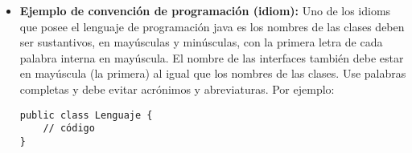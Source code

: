 \documentclass[11pt,letterpaper]{article}
\begin{document}
\begin{enumerate}
\begin{itemize}
\begin{itemize}
                  \item \textbf{Ejemplo de convención de programación (idiom):}
                        Uno de los idioms que posee el lenguaje de programación
                        java es los nombres de las clases deben ser sustantivos,
                        en mayúsculas y minúsculas, con la primera letra de cada
                        palabra interna en mayúscula. El nombre de las
                        interfaces también debe estar en mayúscula (la primera)
                        al igual que los nombres de las clases. Use palabras
                        completas y debe evitar acrónimos y abreviaturas. Por
                        ejemplo:
\begin{verbatim}
public class Lenguaje {
    // código
}
\end{verbatim}


\end{itemize}
\end{itemize}
\end{enumerate}
\end{document}
